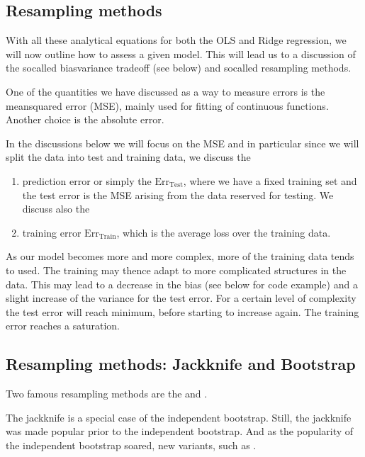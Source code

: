 \documentclass[letterpaper,10pt,english]{sphinxmanual}
\begin{document}
\subsection{Resampling methods}
\label{\detokenize{chapter4:id9}}
With all these analytical equations for both the OLS and Ridge
regression, we will now outline how to assess a given model. This will
lead us to a discussion of the so\sphinxhyphen{}called bias\sphinxhyphen{}variance tradeoff (see
below) and so\sphinxhyphen{}called resampling methods.

One of the quantities we have discussed as a way to measure errors is
the mean\sphinxhyphen{}squared error (MSE), mainly used for fitting of continuous
functions. Another choice is the absolute error.

In the discussions below we will focus on the MSE and in particular since we will split the data into test and training data,
we discuss the
\begin{enumerate}
%
\item {} 
prediction error or simply the  \(\mathrm{Err_{Test}}\), where we have a fixed training set and the test error is the MSE arising from the data reserved for testing. We discuss also the

\item {} 
training error \(\mathrm{Err_{Train}}\), which is the average loss over the training data.

\end{enumerate}

As our model becomes more and more complex, more of the training data tends to  used. The training may thence adapt to more complicated structures in the data. This may lead to a decrease in the bias (see below for code example) and a slight increase of the variance for the test error.
For a certain level of complexity the test error will reach minimum, before starting to increase again. The
training error reaches a saturation.


\subsection{Resampling methods: Jackknife and Bootstrap}
\label{\detokenize{chapter4:resampling-methods-jackknife-and-bootstrap}}
Two famous
resampling methods are the  and .

The jackknife is a special case of the independent bootstrap. Still, the jackknife was made
popular prior to the independent bootstrap. And as the popularity of
the independent bootstrap soared, new variants, such as .
\end{document}

